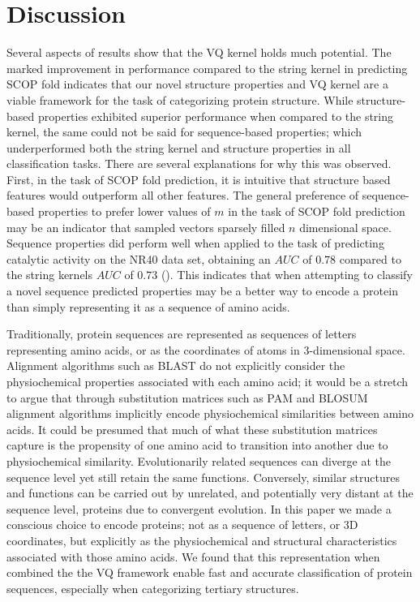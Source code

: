 \section{Discussion}

Several aspects of results show that the VQ kernel holds much potential. The marked improvement in performance compared to the string kernel in predicting SCOP fold indicates that our novel structure properties and VQ kernel are a viable framework for the task of categorizing protein structure. While structure-based properties exhibited superior performance when compared to the string kernel, the same could not be said for sequence-based properties; which underperformed both the string kernel and structure properties in all classification tasks.  There are several explanations for why this was observed.  First, in the task of SCOP fold prediction, it is intuitive that structure based features would outperform all other features.  The general preference of sequence-based properties to prefer lower values of $m$ in the task of SCOP fold prediction may be an indicator that sampled vectors sparsely filled $n$ dimensional space. Sequence properties did perform well when applied to the task of predicting catalytic activity on the NR40 data set, obtaining an $AUC$ of $0.78$ compared to the string kernels $AUC$ of $0.73$ ().  This indicates that when attempting to classify a novel sequence predicted properties may be a better way to encode a protein than simply representing it as a sequence of amino acids.

Traditionally, protein sequences are represented as sequences of letters representing amino acids, or as the coordinates of atoms in 3-dimensional space.  Alignment algorithms such as BLAST \citep{Altschul1997} do not explicitly consider the physiochemical properties associated with each amino acid; it would be a stretch to argue that through substitution matrices such as PAM \citep{Dayhoff1978} and BLOSUM \citep{Henikoff1992} alignment algorithms implicitly encode physiochemical similarities between amino acids.  It could be presumed that much of what these substitution matrices capture is the propensity of one amino acid to transition into another due to physiochemical similarity. Evolutionarily related sequences can diverge at the sequence level yet still retain the same functions. Conversely, similar structures and functions can be carried out by unrelated, and potentially very distant at the sequence level, proteins due to convergent evolution.  In this paper we made a conscious choice to encode proteins; not as a sequence of letters, or 3D coordinates, but explicitly as the physiochemical and structural characteristics associated with those amino acids.  We found that this representation when combined the the VQ framework enable fast and accurate classification of protein sequences, especially when categorizing tertiary structures. 

